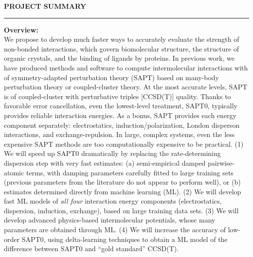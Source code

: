 \documentclass[11pt]{article}
\begin{document}
\thispagestyle{empty}
\setcounter{secnumdepth}{4}
\renewcommand{\thesubsection}{\Alph{subsection}}
\renewcommand{\thesubsubsection}{\arabic{subsubsection}}
                                                                                
\begin{center}
\begin{large}
{\bf PROJECT SUMMARY} \\
\end{large}
\end{center}
\hrule

\vspace*{0.1in}

\hspace*{-0.28in} {\bf Overview:} \\ 

We propose to develop much faster
ways to accurately evaluate the strength of non-bonded interactions,
which govern biomolecular structure, the structure of
organic crystals, and the binding of ligands by proteins.
In previous work, we have produced methods and software
to compute intermolecular interactions with
of symmetry-adapted perturbation theory (SAPT) based on
many-body perturbation theory or coupled-cluster theory.
At the most accurate levels, SAPT is of coupled-cluster with perturbative
triples [CCSD(T)] quality.  Thanks to favorable error cancellation,
even the lowest-level treatment, SAPT0, typically provides reliable
interaction energies.  As a bonus, SAPT provides each energy component
separately: electrostatics, induction/polarization, London disperson
interactions, and exchange-repulsion.
In large, complex systems, even the less expensive SAPT methods are
too computationally expensive to be practical.  (1) We will
speed up SAPT0 dramatically by replacing the rate-determining
dispersion step with very fast estimates:
(a) semi-empirical damped pairwise-atomic terms, with
damping parameters carefully fitted to large training sets (previous
parameters from the literature do not appear to perform well), or (b)
estimates determined directly from machine learning (ML).  (2) We will
develop fast ML models of {\em all four} interaction
energy components (electrostatics, dispersion, induction, exchange),
based on large training data sets.  (3) We will
develop advanced physics-based intermolecular potentials, whose
many parameters are obtained through ML.  (4) We will
increase the accuracy of low-order SAPT0, using delta-learning
techniques to obtain a ML model of the difference between
SAPT0 and ``gold standard'' CCSD(T).
\end{document}

